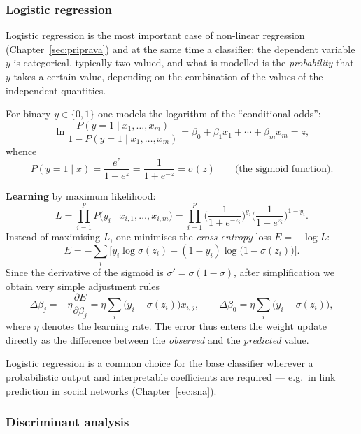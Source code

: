 \documentclass[11pt,a4paper]{article}
\theoremstyle{definition}
\providecommand{\uv}[1]{``#1''}
\begin{document}
\subsubsection{Logistic regression}
\label{ssec:logreg}

Logistic regression is the most important case of non-linear regression
(Chapter~\ref{sec:priprava}) and at the same time a classifier: the dependent variable $y$ is
categorical, typically two-valued, and what is modelled is the \emph{probability} that $y$ takes
a certain value, depending on the combination of the values of the independent quantities.

\begin{defbox}
For binary $y\in\{0,1\}$ one models the logarithm of the \uv{conditional odds}:
\[ \ln\frac{P(y=1\mid x_1,\dots,x_m)}{1-P(y=1\mid x_1,\dots,x_m)}
   =\beta_0+\beta_1x_1+\cdots+\beta_mx_m=z, \]
whence
\[ P(y=1\mid x)=\frac{e^{z}}{1+e^{z}}=\frac{1}{1+e^{-z}}=\sigma(z)
   \qquad\text{(the sigmoid function).} \]

\textbf{Learning} by maximum likelihood:
\[ L=\prod_{i=1}^{p}P\big(y_i\mid x_{i,1},\dots,x_{i,m}\big)
   =\prod_{i=1}^{p}\Big(\frac{1}{1+e^{-z_i}}\Big)^{y_i}
     \Big(\frac{1}{1+e^{z_i}}\Big)^{1-y_i}. \]
Instead of maximising $L$, one minimises the \emph{cross-entropy} loss $E=-\log L$:
\[ E=-\sum_i\Big[y_i\log\sigma(z_i)+(1-y_i)\log\big(1-\sigma(z_i)\big)\Big]. \]
Since the derivative of the sigmoid is $\sigma'=\sigma(1-\sigma)$, after simplification we obtain
very simple adjustment rules
\[ \Delta\beta_j=-\eta\frac{\partial E}{\partial\beta_j}
   =\eta\sum_i\big(y_i-\sigma(z_i)\big)x_{i,j},\qquad
   \Delta\beta_0=\eta\sum_i\big(y_i-\sigma(z_i)\big), \]
where $\eta$ denotes the learning rate. The error thus enters the weight update directly as the
difference between the \emph{observed} and the \emph{predicted} value.
\end{defbox}

Logistic regression is a common choice for the base classifier wherever a probabilistic output
and interpretable coefficients are required --- e.g.\ in link prediction in social networks
(Chapter~\ref{sec:sna}).

\subsubsection{Discriminant analysis}
\end{document}
